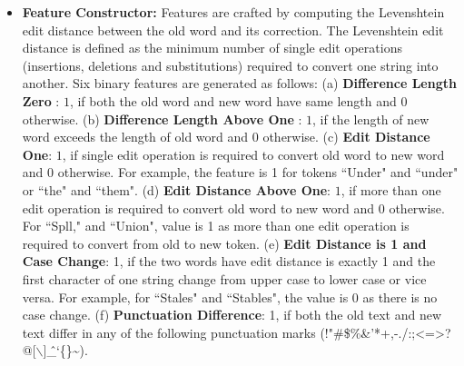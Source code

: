 \documentclass{sig-alternate}
\begin{document}
\begin{enumerate}
\begin{itemize}
\item \textbf{Feature Constructor: } Features are crafted by computing the Levenshtein edit distance between the old word and its correction. The Levenshtein edit distance \cite{Wagner_74} is defined as the minimum number of single edit operations (insertions, deletions and substitutions) required to convert one string into another. Six binary features are generated as follows: 
(a) \textbf{Difference Length Zero} : $1$, if both the old word and new word have same length and $0$ otherwise. 
(b) \textbf{Difference Length Above One} : $1$, if the length of new word exceeds the length of old word and $0$ otherwise.
(c) \textbf{Edit Distance One}:  $1$, if single edit operation is required to convert old word to new word and $0$ otherwise. For example, the feature is 1 for tokens ``Under" and ``under" or ``the" and ``them".
(d) \textbf{Edit Distance Above One}: $1$, if more than one edit operation is required to convert old word to new word and $0$ otherwise. For ``Spll," and ``Union", value is 1 as more than one edit operation is required to convert from old to new token.
(e) \textbf{Edit Distance is 1 and Case Change}: 1, if the two words have edit distance is exactly 1 and the first character of one string change from upper case to lower case or vice versa. For example, for ``Stales" and ``Stables", the value is 0 as there is no case change.
(f) \textbf{Punctuation Difference}: 1, if both the old text and new text differ in any of the following punctuation marks (!"\#\$\%\&'*+,-./:;\textless=\textgreater?@[$\backslash$]\^\_`\{\textbar\}\textasciitilde).




\end{itemize}
\end{enumerate}
\end{document}
